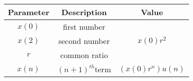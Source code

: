 \begin{tabular}{|c|c|c|}
        \hline
        \textbf{Parameter} & \textbf{Description} &\textbf{Value}\\
        \hline
        $x(0)$ & first number& \\
         \hline
        $x(2)$ & second number & $x(0)r^2$\\
        \hline
        $r$ & common ratio &\\
        \hline
        $x(n)$ & $(n + 1)^{th}$term & $(x(0)r^n)u(n)$\\
        \hline
    \end{tabular}
